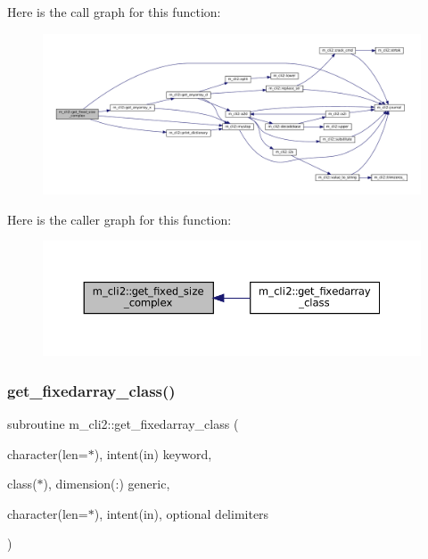 Here is the call graph for this function\+:
\nopagebreak
\begin{figure}[H]
\begin{center}
\leavevmode
\includegraphics[width=350pt]{namespacem__cli2_a32b78784e20e29bf40f17e16d08336fa_cgraph}
\end{center}
\end{figure}
Here is the caller graph for this function\+:
\nopagebreak
\begin{figure}[H]
\begin{center}
\leavevmode
\includegraphics[width=350pt]{namespacem__cli2_a32b78784e20e29bf40f17e16d08336fa_icgraph}
\end{center}
\end{figure}
\mbox{\label{namespacem__cli2_a6d8c1c441ac15f9a2882e50459d39565}} 
\subsubsection{\texorpdfstring{get\+\_\+fixedarray\+\_\+class()}{get\_fixedarray\_class()}}
{\footnotesize\ttfamily subroutine m\+\_\+cli2\+::get\+\_\+fixedarray\+\_\+class (\begin{DoxyParamCaption}\item[{character(len=$\ast$), intent(in)}]{keyword,  }\item[{class($\ast$), dimension(\+:)}]{generic,  }\item[{character(len=$\ast$), intent(in), optional}]{delimiters }\end{DoxyParamCaption})\hspace{0.3cm}{\ttfamily [private]}}



